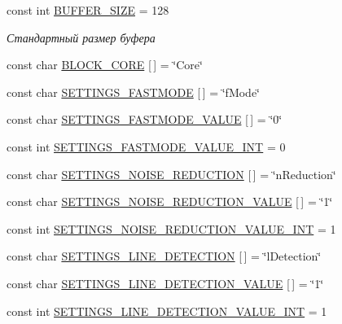 \begin{DoxyCompactItemize}
\item 
const int \mbox{\hyperlink{namespaceyenot_a08846c7b8addedd4db68b5cf3721bda1}{B\+U\+F\+F\+E\+R\+\_\+\+S\+I\+ZE}} = 128
\begin{DoxyCompactList}\small\item\em Стандартный размер буфера \end{DoxyCompactList}\item 
const char \mbox{\hyperlink{namespaceyenot_a2172a9f506029215b790a51a4023e1ac}{B\+L\+O\+C\+K\+\_\+\+C\+O\+RE}} \mbox{[}$\,$\mbox{]} = \char`\"{}Core\char`\"{}
\item 
const char \mbox{\hyperlink{namespaceyenot_a254a74c9007fa3d541605ff059a74add}{S\+E\+T\+T\+I\+N\+G\+S\+\_\+\+F\+A\+S\+T\+M\+O\+DE}} \mbox{[}$\,$\mbox{]} = \char`\"{}f\+Mode\char`\"{}
\item 
const char \mbox{\hyperlink{namespaceyenot_a7afad42fc42152730906aa57ef688c9a}{S\+E\+T\+T\+I\+N\+G\+S\+\_\+\+F\+A\+S\+T\+M\+O\+D\+E\+\_\+\+V\+A\+L\+UE}} \mbox{[}$\,$\mbox{]} = \char`\"{}0\char`\"{}
\item 
const int \mbox{\hyperlink{namespaceyenot_aef79e343f25022f42e779be319348eec}{S\+E\+T\+T\+I\+N\+G\+S\+\_\+\+F\+A\+S\+T\+M\+O\+D\+E\+\_\+\+V\+A\+L\+U\+E\+\_\+\+I\+NT}} = 0
\item 
const char \mbox{\hyperlink{namespaceyenot_a01aebb6f9dc4632eabd3ef606f5c75fb}{S\+E\+T\+T\+I\+N\+G\+S\+\_\+\+N\+O\+I\+S\+E\+\_\+\+R\+E\+D\+U\+C\+T\+I\+ON}} \mbox{[}$\,$\mbox{]} = \char`\"{}n\+Reduction\char`\"{}
\item 
const char \mbox{\hyperlink{namespaceyenot_a557e3ad9f3290543eed07f92644f1e33}{S\+E\+T\+T\+I\+N\+G\+S\+\_\+\+N\+O\+I\+S\+E\+\_\+\+R\+E\+D\+U\+C\+T\+I\+O\+N\+\_\+\+V\+A\+L\+UE}} \mbox{[}$\,$\mbox{]} = \char`\"{}1\char`\"{}
\item 
const int \mbox{\hyperlink{namespaceyenot_aaaef89f90413ee7a52a64d043e068136}{S\+E\+T\+T\+I\+N\+G\+S\+\_\+\+N\+O\+I\+S\+E\+\_\+\+R\+E\+D\+U\+C\+T\+I\+O\+N\+\_\+\+V\+A\+L\+U\+E\+\_\+\+I\+NT}} = 1
\item 
const char \mbox{\hyperlink{namespaceyenot_a6d4d3d03406bad7102e67e0f0d81edc2}{S\+E\+T\+T\+I\+N\+G\+S\+\_\+\+L\+I\+N\+E\+\_\+\+D\+E\+T\+E\+C\+T\+I\+ON}} \mbox{[}$\,$\mbox{]} = \char`\"{}l\+Detection\char`\"{}
\item 
const char \mbox{\hyperlink{namespaceyenot_ae8e9b52935a937554723960a8933df49}{S\+E\+T\+T\+I\+N\+G\+S\+\_\+\+L\+I\+N\+E\+\_\+\+D\+E\+T\+E\+C\+T\+I\+O\+N\+\_\+\+V\+A\+L\+UE}} \mbox{[}$\,$\mbox{]} = \char`\"{}1\char`\"{}
\item 
const int \mbox{\hyperlink{namespaceyenot_a07cb3f48df07dea977024678d96871f8}{S\+E\+T\+T\+I\+N\+G\+S\+\_\+\+L\+I\+N\+E\+\_\+\+D\+E\+T\+E\+C\+T\+I\+O\+N\+\_\+\+V\+A\+L\+U\+E\+\_\+\+I\+NT}} = 1

\end{DoxyCompactItemize}
